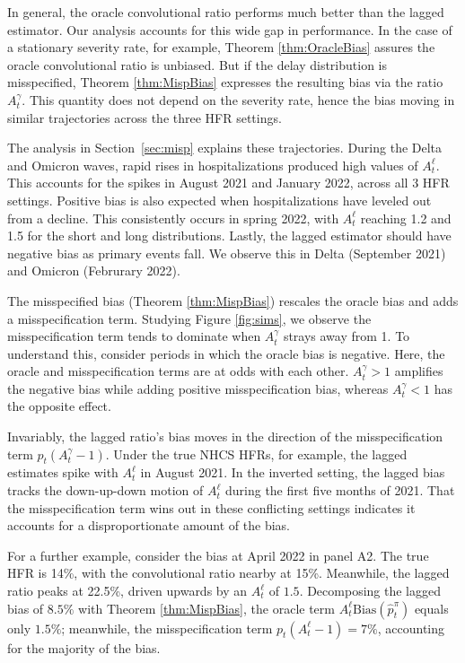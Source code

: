 \documentclass{article}
\begin{document}
In general, the oracle convolutional ratio performs much better than the lagged estimator. Our analysis accounts for this wide gap in performance. In the case of a stationary severity rate, for example, Theorem \ref{thm:OracleBias} assures the oracle convolutional ratio is unbiased. But if the delay distribution is misspecified, Theorem \ref{thm:MispBias} expresses the resulting bias via the ratio $A_t^\gamma$. This quantity does not depend on the severity rate, hence the bias moving in similar trajectories across the three HFR settings. 

The analysis in Section~\ref{sec:misp} explains these trajectories. During the Delta and Omicron waves, rapid rises in hospitalizations produced high values of $A_t^\ell$. This accounts for the spikes in August 2021 and January 2022, across all 3 HFR settings. Positive bias is also expected when hospitalizations have leveled out from a decline. This consistently occurs in spring 2022, with $A_t^\ell$ reaching 1.2 and 1.5 for the short and long distributions. Lastly, the lagged estimator should have negative bias as primary events fall. We observe this in Delta (September 2021) and Omicron (Februrary 2022). 

The misspecified bias (Theorem \ref{thm:MispBias}) rescales the oracle bias and adds a misspecification term. Studying Figure \ref{fig:sims}, we observe the misspecification term tends to dominate when $A_t^\gamma$ strays away from 1. To understand this, consider periods in which the oracle bias is negative. Here, the oracle and misspecification terms are at odds with each other. $A_t^\gamma > 1$ amplifies the negative bias while adding positive misspecification bias, whereas $A_t^\gamma<1$ has the opposite effect.

Invariably, the lagged ratio's bias moves in the direction of the misspecification term $p_t(A_t^\gamma-1)$. Under the true NHCS HFRs, for example, the lagged estimates spike with $A_t^\ell$ in August 2021. In the inverted setting, the lagged bias tracks the down-up-down motion of $A_t^\ell$ during the first five months of 2021. That the misspecification term wins out in these conflicting settings indicates it accounts for a disproportionate amount of the bias. 

For a further example, consider the bias at April 2022 in panel A2. The true HFR is 14\%, with the convolutional ratio nearby at 15\%. Meanwhile, the lagged ratio peaks at 22.5\%, driven upwards by an $A_t^\ell$ of $1.5$. Decomposing the lagged bias of $8.5\%$ with Theorem \ref{thm:MispBias}, the oracle term $A_t^\ell \text{Bias}(\hat{p}_t^\pi)$ equals only $1.5\%$; meanwhile, the misspecification term $p_t(A_t^\ell-1) = 7\%$, accounting for the majority of the bias. 
\end{document}
